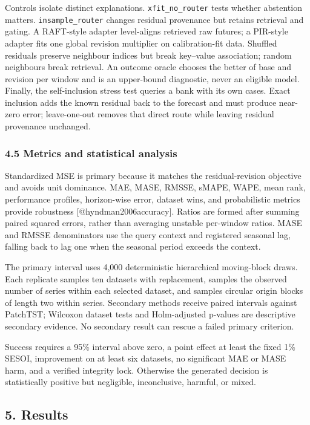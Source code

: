 \documentclass[
]{article}
\begin{document}
Controls isolate distinct explanations. \texttt{xfit\_no\_router} tests
whether abstention matters. \texttt{insample\_router} changes residual
provenance but retains retrieval and gating. A RAFT-style adapter
level-aligns retrieved raw futures; a PIR-style adapter fits one global
revision multiplier on calibration-fit data. Shuffled residuals preserve
neighbour indices but break key--value association; random neighbours
break retrieval. An outcome oracle chooses the better of base and
revision per window and is an upper-bound diagnostic, never an eligible
model. Finally, the self-inclusion stress test queries a bank with its
own cases. Exact inclusion adds the known residual back to the forecast
and must produce near-zero error; leave-one-out removes that direct
route while leaving residual provenance unchanged.

\subsubsection{4.5 Metrics and statistical
analysis}\label{45-metrics-and-statistical-analysis}

Standardized MSE is primary because it matches the residual-revision
objective and avoids unit dominance. MAE, MASE, RMSSE, sMAPE, WAPE, mean
rank, performance profiles, horizon-wise error, dataset wins, and
probabilistic metrics provide robustness {[}@hyndman2006accuracy{]}.
Ratios are formed after summing paired squared errors, rather than
averaging unstable per-window ratios. MASE and RMSSE denominators use
the query context and registered seasonal lag, falling back to lag one
when the seasonal period exceeds the context.

The primary interval uses 4,000 deterministic hierarchical moving-block
draws. Each replicate samples ten datasets with replacement, samples the
observed number of series within each selected dataset, and samples
circular origin blocks of length two within series. Secondary methods
receive paired intervals against PatchTST; Wilcoxon dataset tests and
Holm-adjusted p-values are descriptive secondary evidence. No secondary
result can rescue a failed primary criterion.

Success requires a 95\% interval above zero, a point effect at least the
fixed 1\% SESOI, improvement on at least six datasets, no significant
MAE or MASE harm, and a verified integrity lock. Otherwise the generated
decision is statistically positive but negligible, inconclusive,
harmful, or mixed.

\subsection{5. Results}\label{5-results}
\end{document}
